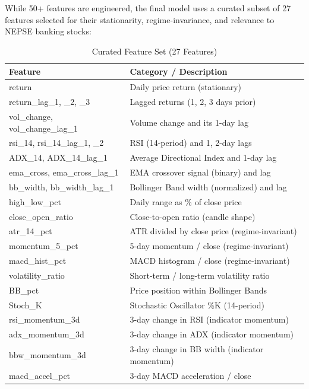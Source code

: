 \documentclass[12pt, a4paper]{report}
\begin{document}
	While 50+ features are engineered, the final model uses a curated subset of 27 features selected for their stationarity, regime-invariance, and relevance to NEPSE banking stocks:
	
	\begin{table}[H]
		\centering
		\begin{tabularx}{\textwidth}{|l|X|}
			\hline
			\textbf{Feature} & \textbf{Category / Description} \\
			\hline
			return & Daily price return (stationary) \\
			\hline
			return\_lag\_1, \_2, \_3 & Lagged returns (1, 2, 3 days prior) \\
			\hline
			vol\_change, vol\_change\_lag\_1 & Volume change and its 1-day lag \\
			\hline
			rsi\_14, rsi\_14\_lag\_1, \_2 & RSI (14-period) and 1, 2-day lags \\
			\hline
			ADX\_14, ADX\_14\_lag\_1 & Average Directional Index and 1-day lag \\
			\hline
			ema\_cross, ema\_cross\_lag\_1 & EMA crossover signal (binary) and lag \\
			\hline
			bb\_width, bb\_width\_lag\_1 & Bollinger Band width (normalized) and lag \\
			\hline
			high\_low\_pct & Daily range as \% of close price \\
			\hline
			close\_open\_ratio & Close-to-open ratio (candle shape) \\
			\hline
			atr\_14\_pct & ATR divided by close price (regime-invariant) \\
			\hline
			momentum\_5\_pct & 5-day momentum / close (regime-invariant) \\
			\hline
			macd\_hist\_pct & MACD histogram / close (regime-invariant) \\
			\hline
			volatility\_ratio & Short-term / long-term volatility ratio \\
			\hline
			BB\_pct & Price position within Bollinger Bands \\
			\hline
			Stoch\_K & Stochastic Oscillator \%K (14-period) \\
			\hline
			rsi\_momentum\_3d & 3-day change in RSI (indicator momentum) \\
			\hline
			adx\_momentum\_3d & 3-day change in ADX (indicator momentum) \\
			\hline
			bbw\_momentum\_3d & 3-day change in BB width (indicator momentum) \\
			\hline
			macd\_accel\_pct & 3-day MACD acceleration / close \\
			\hline
		\end{tabularx}
		\caption{Curated Feature Set (27 Features)}
		\label{tab:curated-features}
	\end{table}
	
\end{document}
